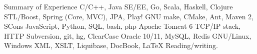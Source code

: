 \begin{rubric}{Summary of Experience}
   C/C++, Java SE/EE, Go, Scala, Haskell, Clojure
  \entry*[Frameworks] STL/Boost, Spring (Core, MVC), JPA, Play!
   GNU make, CMake, Ant, Maven 2, SCons
  \entry*[Scripting] JavaScript, Python, SQL, bash, php
  \entry*[Servers] Apache Tomcat 6
  \entry*[Protocols] TCP/IP stack, HTTP
  \entry*[VCS] Subversion, git, hg, ClearCase
  \entry*[DataBases] Oracle 10/11, MySQL, Redis
  \entry*[OS] GNU/Linux, Windows
  \entry*[Other] XML, XSLT, Liquibase, DocBook, \LaTeX
  \entry*[English] Reading/writing.
\end{rubric}
